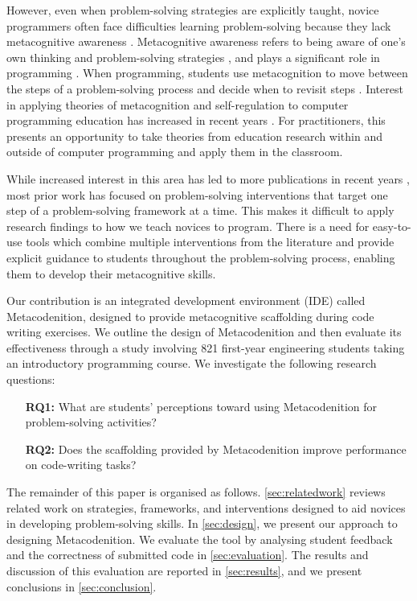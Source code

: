 \documentclass[sigconf,anonymous]{acmart}
\begin{document}
However, even when problem-solving strategies are explicitly taught, novice programmers often face difficulties learning problem-solving because they lack metacognitive awareness \cite{anneli1993, loksa2016, mani2013}. Metacognitive awareness refers to being aware of one's own thinking and problem-solving strategies \cite{gibson1996}, and plays a significant role in programming \cite{parham2010}. When programming, students use metacognition to move between the steps of a problem-solving process and decide when to revisit steps \cite{parham2010}. Interest in applying theories of metacognition and self-regulation to computer programming education has increased in recent years \cite{loksa2022}. For practitioners, this presents an opportunity to take theories from education research within and outside of computer programming and apply them in the classroom.

While increased interest in this area has led to more publications in recent years \cite{loksa2022}, most prior work has focused on problem-solving interventions that target one step of a problem-solving framework at a time. This makes it difficult to apply research findings to how we teach novices to program. There is a need for easy-to-use tools which combine multiple interventions from the literature and provide explicit guidance to students throughout the problem-solving process, enabling them to develop their metacognitive skills.

Our contribution is an integrated development environment (IDE) called Metacodenition, designed to provide metacognitive scaffolding during code writing exercises. We outline the design of Metacodenition and then evaluate its effectiveness through a study involving 821 first-year engineering students taking an introductory programming course. We investigate the following research questions:

\begin{itemize}
\item[\textbf{RQ1:}]  What are students' perceptions toward using Metacodenition for problem-solving activities?
\item[\textbf{RQ2:}]  Does the scaffolding provided by Metacodenition improve performance on code-writing tasks?
\end{itemize}


The remainder of this paper is organised as follows. \autoref{sec:relatedwork} reviews related work on strategies, frameworks, and interventions designed to aid novices in developing problem-solving skills. In \autoref{sec:design}, we present our approach to designing Metacodenition. We evaluate the tool by analysing student feedback and the correctness of submitted code in \autoref{sec:evaluation}. The results and discussion of this evaluation are reported in \autoref{sec:results}, and we present conclusions in \autoref{sec:conclusion}.
\end{document}
